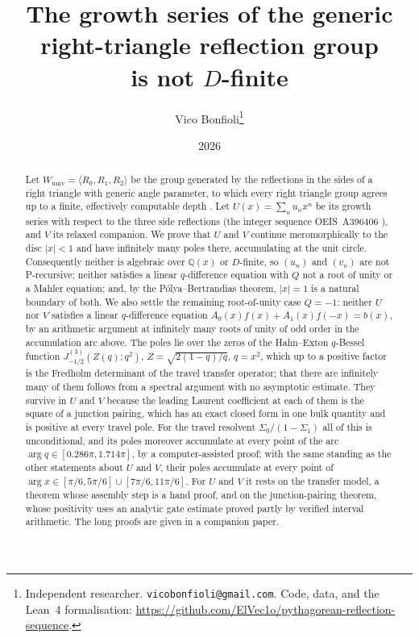\documentclass[11pt]{article}
\title{The growth series of the generic right-triangle reflection group\\ is not $D$-finite}
\author{Vico Bonfioli\thanks{Independent researcher. \texttt{vicobonfioli@gmail.com}.
Code, data, and the Lean~4 formalisation:
\url{https://github.com/ElVec1o/pythagorean-reflection-sequence}.}}
\date{2026}
\theoremstyle{plain}
\theoremstyle{definition}
\theoremstyle{remark}
\newcommand{\Q}{\mathbb{Q}}
\theoremstyle{plain}\newtheorem*{maintheorem}{Main Theorem}
\begin{document}
\maketitle

\begin{abstract}
\noindent Let $W_{\mathrm{univ}}=\langle R_0,R_1,R_2\rangle$ be the group generated by the
reflections in the sides of a right triangle with generic angle parameter, to which every right
triangle group agrees up to a finite, effectively computable depth \cite{Bonfioli2026a}. Let
$U(x)=\sum_nu_nx^n$ be its growth series with respect to the three side reflections (the integer
sequence \textup{OEIS~A396406} \cite{OEIS}), and $V$ its relaxed companion. We prove that $U$ and $V$
continue meromorphically to the disc $|x|<1$ and have infinitely many poles there, accumulating at
the unit circle. Consequently neither is algebraic over $\Q(x)$ or $D$-finite, so $(u_n)$ and
$(v_n)$ are not P-recursive; neither satisfies a linear $q$-difference equation with $Q$ not a root
of unity or a Mahler equation; and, by the P\'olya--Bertrandias theorem, $|x|=1$ is a natural
boundary of both. We also settle the remaining root-of-unity case $Q=-1$: neither $U$ nor $V$
satisfies a linear $q$-difference equation $A_0(x)f(x)+A_1(x)f(-x)=b(x)$, by an arithmetic argument
at infinitely many roots of unity of odd order in the accumulation arc above. The poles lie over the zeros of the Hahn--Exton $q$-Bessel function
$J^{(3)}_{-1/2}(Z(q);q^2)$, $Z=\sqrt{2(1-q)/q}$, $q=x^2$, which up to a positive factor is the
Fredholm determinant of the travel transfer operator; that there are infinitely many of them
follows from a spectral argument with no asymptotic estimate. They survive in $U$ and $V$ because
the leading Laurent coefficient at each of them is the square of a junction pairing, which has an
exact closed form in one bulk quantity and is positive at every travel pole. For the travel
resolvent $\Sigma_0/(1-\Sigma_1)$ all of this is unconditional, and its poles moreover accumulate at
every point of the arc $\arg q\in[0.286\pi,1.714\pi]$, by a computer-assisted proof; with the same standing
as the other statements about $U$ and $V$, their poles accumulate at every point of
$\arg x\in[\pi/6,5\pi/6]\cup[7\pi/6,11\pi/6]$. For $U$ and $V$ it rests on the
transfer model, a theorem whose assembly step is a hand proof, and on the junction-pairing
theorem, whose positivity uses an analytic gate estimate proved partly by verified interval
arithmetic. The long proofs are given in a companion paper.
\end{abstract}
\end{document}
